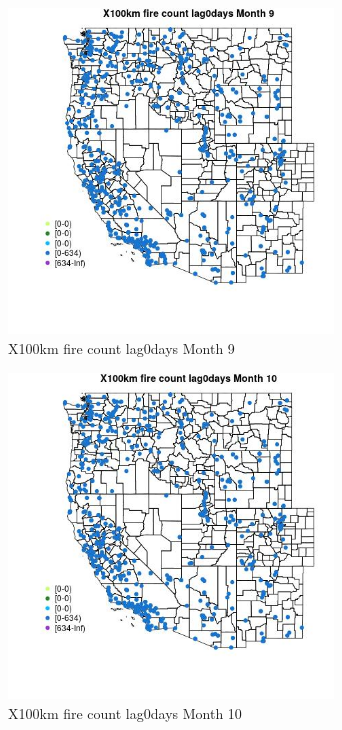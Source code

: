 \begin{figure} 
\centering  
\includegraphics[width=0.77\textwidth]{Code_Outputs/Report_ML_input_PM25_Step4_part_e_de_duplicated_aves_compiled_2019-05-14wNAs_MapObsMo9X100km_fire_count_lag0days.jpg} 
\caption{\label{fig:Report_ML_input_PM25_Step4_part_e_de_duplicated_aves_compiled_2019-05-14wNAsMapObsMo9X100km_fire_count_lag0days}X100km fire count lag0days Month 9} 
\end{figure} 
 

\begin{figure} 
\centering  
\includegraphics[width=0.77\textwidth]{Code_Outputs/Report_ML_input_PM25_Step4_part_e_de_duplicated_aves_compiled_2019-05-14wNAs_MapObsMo10X100km_fire_count_lag0days.jpg} 
\caption{\label{fig:Report_ML_input_PM25_Step4_part_e_de_duplicated_aves_compiled_2019-05-14wNAsMapObsMo10X100km_fire_count_lag0days}X100km fire count lag0days Month 10} 
\end{figure} 
 

